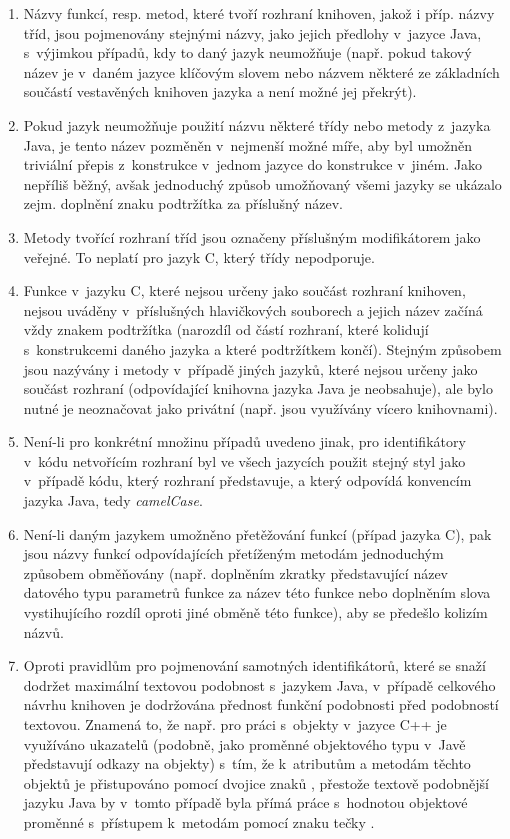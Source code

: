\documentclass[czech,BP]{thesiskiv}
\begin{document}
\begin{enumerate}
\item{Názvy funkcí, resp. metod, které tvoří rozhraní knihoven, jakož i příp. názvy tříd, jsou pojmenovány stejnými názvy, jako jejich předlohy v~jazyce Java, s~výjimkou případů, kdy to daný jazyk neumožňuje (např. pokud takový název je v~daném jazyce klíčovým slovem nebo názvem některé ze základních součástí vestavěných knihoven jazyka a není možné jej překrýt).}
\item{Pokud jazyk neumožňuje použití názvu některé třídy nebo metody z~jazyka Java, je tento název pozměněn v~nejmenší možné míře, aby byl umožněn triviální přepis z~konstrukce v~jednom jazyce do konstrukce v~jiném. Jako nepříliš běžný, avšak jednoduchý způsob umožňovaný všemi jazyky se ukázalo zejm. doplnění znaku podtržítka \uv{\_} za příslušný název.}
\item{Metody tvořící rozhraní tříd jsou označeny příslušným modifikátorem jako veřejné. To neplatí pro jazyk C, který třídy nepodporuje.}
\item{Funkce v~jazyku C, které nejsou určeny jako součást rozhraní knihoven, nejsou uváděny v~příslušných hlavičkových souborech a jejich název začíná vždy znakem podtržítka (narozdíl od částí rozhraní, které kolidují s~konstrukcemi daného jazyka a které podtržítkem končí). Stejným způsobem jsou nazývány i metody v~případě jiných jazyků, které nejsou určeny jako součást rozhraní (odpovídající knihovna jazyka Java je neobsahuje), ale bylo nutné je neoznačovat jako privátní (např. jsou využívány vícero knihovnami).}
\item{Není-li pro konkrétní množinu případů uvedeno jinak, pro identifikátory v~kódu netvořícím rozhraní byl ve všech jazycích použit stejný styl jako v~případě kódu, který rozhraní představuje, a který odpovídá konvencím jazyka Java, tedy \textit{camelCase}.}
\item{Není-li daným jazykem umožněno přetěžování funkcí (případ jazyka C), pak jsou názvy funkcí odpovídajících přetíženým metodám jednoduchým způsobem obměňovány (např. doplněním zkratky představující název datového typu parametrů funkce za název této funkce nebo doplněním slova vystihujícího rozdíl oproti jiné obměně této funkce), aby se předešlo kolizím názvů.}
\item{Oproti pravidlům pro pojmenování samotných identifikátorů, které se snaží dodržet maximální textovou podobnost s~jazykem Java, v~případě celkového návrhu knihoven je dodržována přednost funkční podobnosti před podobností textovou. Znamená to, že např. pro práci s~objekty v~jazyce C++ je využíváno ukazatelů (podobně, jako proměnné objektového typu v~Javě představují odkazy na objekty) s~tím, že k~atributům a metodám těchto objektů je přistupováno pomocí dvojice znaků \uv{->}, přestože textově podobnější jazyku Java by v~tomto případě byla přímá práce s~hodnotou objektové proměnné s~přístupem k~metodám pomocí znaku tečky .}

\end{enumerate}
\end{document}
